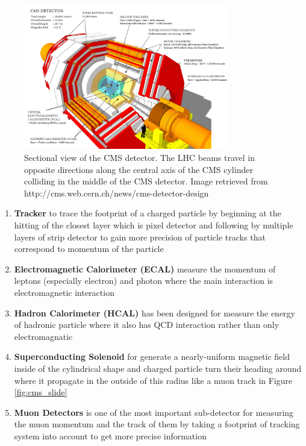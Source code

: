 \begin{figure}[h!]
    \centering
    \includegraphics[width=0.8\textwidth]{images/cms_structure.png}
    \caption{Sectional view of the CMS detector. The LHC beams travel in opposite directions along the central axis of the CMS cylinder colliding in the middle of the CMS detector. Image retrieved from http://cms.web.cern.ch/news/cms-detector-design}
    \label{fig:cms_structure}
\end{figure}
\begin{enumerate}
    \item \textbf{Tracker} to trace the footprint of a charged particle by beginning at the hitting of the closest layer which is pixel detector and following by multiple layers of strip detector to gain more precision of particle tracks that correspond to momentum of the particle
    \item \textbf{Electromagnetic Calorimeter (ECAL)} measure the momentum of leptons (especially electron) and photon where the main interaction is electromagnetic interaction
    \item \textbf{Hadron Calorimeter (HCAL)} has been designed for measure the energy of hadronic particle where it also has QCD interaction rather than only electromagnatic
    \item \textbf{Superconducting Solenoid} for generate a nearly-uniform magnetic field inside of the cylindrical shape and charged particle turn their heading around where it propagate in the outside of this radius like a muon track in Figure \ref{fig:cms_slide}
    \item \textbf{Muon Detectors} is one of the most important sub-detector for measuring the muon momentum and the track of them by taking a footprint of tracking system into account to get more precise information
\end{enumerate}
